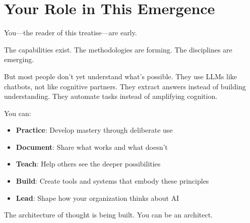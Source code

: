 \chapter{Your Role in This Emergence}

You---the reader of this treatise---are early.

The capabilities exist. The methodologies are forming. The disciplines are emerging.

But most people don't yet understand what's possible. They use LLMs like chatbots, not like cognitive partners. They extract answers instead of building understanding. They automate tasks instead of amplifying cognition.

You can:

\begin{itemize}
    \item \textbf{Practice}: Develop mastery through deliberate use
    \item \textbf{Document}: Share what works and what doesn't
    \item \textbf{Teach}: Help others see the deeper possibilities
    \item \textbf{Build}: Create tools and systems that embody these principles
    \item \textbf{Lead}: Shape how your organization thinks about AI
\end{itemize}

The architecture of thought is being built. You can be an architect.


